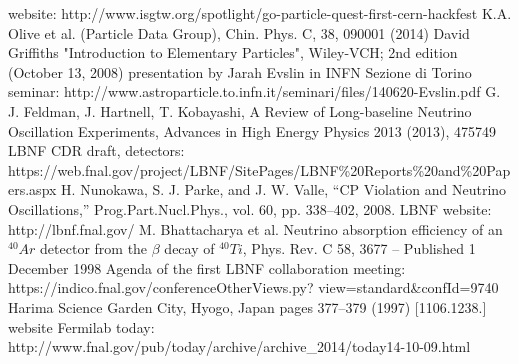 \begin{thebibliography}{1}
    website: http://www.isgtw.org/spotlight/go-particle-quest-first-cern-hackfest
    K.A. Olive et al. (Particle Data Group), Chin. Phys. C, 38, 090001 (2014) 
    David Griffiths "Introduction to Elementary Particles", Wiley-VCH; 2nd edition (October 13, 2008)
    presentation by Jarah Evslin in INFN Sezione di Torino seminar: http://www.astroparticle.to.infn.it/seminari/files/140620-Evslin.pdf
    G. J. Feldman, J. Hartnell, T. Kobayashi, A Review of Long-baseline Neutrino Oscillation Experiments, Advances in High Energy Physics 2013 (2013), 475749
    LBNF CDR draft, detectors: https://web.fnal.gov/project/LBNF/SitePages/LBNF\%20Reports\%20and\%20Papers.aspx
    H. Nunokawa, S. J. Parke, and J. W. Valle, “CP Violation and Neutrino Oscillations,”
Prog.Part.Nucl.Phys., vol. 60, pp. 338–402, 2008.
    LBNF website: http://lbnf.fnal.gov/
    M. Bhattacharya et al. Neutrino absorption efficiency of an $^{40}Ar$ detector from the $\beta$ decay of $^{40}Ti$, Phys. Rev. C 58, 3677 – Published 1 December 1998
    Agenda of the first LBNF collaboration meeting: https://indico.fnal.gov/conferenceOtherViews.py? view=standard\&confId=9740
Harima Science Garden City, Hyogo, Japan pages 377–379 (1997)
[1106.1238.]
    website Fermilab today: http://www.fnal.gov/pub/today/archive/archive\_2014/today14-10-09.html
\end{thebibliography}
